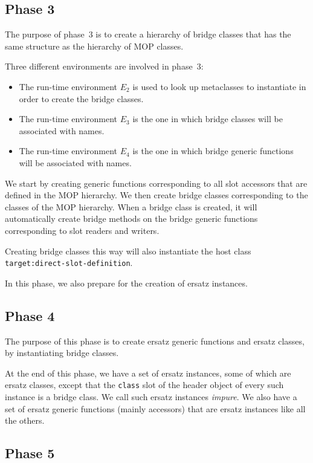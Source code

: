 \subsection{Phase 3}

The purpose of phase~3 is to create a hierarchy of bridge classes that
has the same structure as the hierarchy of MOP classes.

Three different environments are involved in phase~3:

\begin{itemize}
\item The run-time environment $E_2$ is used to look up metaclasses to
  instantiate in order to create the bridge classes.
\item The run-time environment $E_3$ is the one in which bridge
  classes will be associated with names.
\item The run-time environment $E_4$ is the one in which bridge
  generic functions will be associated with names.
\end{itemize}

We start by creating generic functions corresponding to all slot
accessors that are defined in the MOP hierarchy.  We then create
bridge classes corresponding to the classes of the MOP hierarchy.
When a bridge class is created, it will automatically create bridge
methods on the bridge generic functions corresponding to slot readers
and writers.

Creating bridge classes this way will also instantiate the host class
\texttt{target:direct-slot-definition}.

In this phase, we also prepare for the creation of ersatz instances.

\subsection{Phase 4}

The purpose of this phase is to create ersatz generic functions and
ersatz classes, by instantiating bridge classes. 

At the end of this phase, we have a set of ersatz instances, some of
which are ersatz classes, except that the \texttt{class} slot of the
header object of every such instance is a bridge class.  We call such
ersatz instances \emph{impure}.  We also have a set of ersatz generic
functions (mainly accessors) that are ersatz instances like all the
others.

\subsection{Phase 5}

